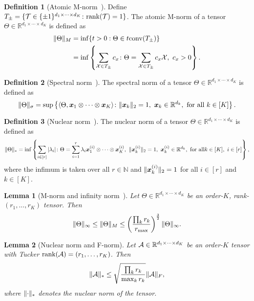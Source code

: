 \documentclass[11pt]{article}
\theoremstyle{plain}
\newtheorem{lem}{Lemma}
\theoremstyle{definition}
\newtheorem{defn}{Definition}
\begin{document}
\begin{defn}[Atomic M-norm~\citep{ghadermarzy2019near}]
Define $T_{\pm}=\{\mathcal{T}\in\{\pm 1 \}^{d_1\times \cdots \times d_K}\colon \text{rank}(\mathcal{T})=1\}$. The atomic M-norm of a tensor $\Theta\in\mathbb{R}^{d_1\times \cdots \times d_K}$ is defined as
\begin{align}
\lVert\Theta\rVert_M&=\inf\{t>0: \Theta\in t\text{conv}(T_{\pm})\}\\
&=\inf\left\{\sum_{\mathcal{X}\in T_{\pm}}c_x\colon \Theta=\sum_{\mathcal{X}\in T_{\pm}} c_x\mathcal{X}, \ c_x>0\right\}.
\end{align}
\end{defn}

\begin{defn}[Spectral norm~\citep{lim2005singular}]
The spectral norm of a tensor $\Theta\in\mathbb{R}^{d_1\times \cdots \times d_K}$ is defined as
\[
\snormSize{}{\Theta}=\sup\left\{\langle \Theta, \mx_1\otimes \cdots \otimes \mx_K\rangle \colon \vnormSize{}{\mx_k}=1,\ \mx_k\in\mathbb{R}^{d_k},\ \text{for all}\ k\in[K]\right\}.
\]
\end{defn}

\begin{defn}[Nuclear norm~\citep{friedland2018nuclear}]
The nuclear norm of a tensor $\Theta\in\mathbb{R}^{d_1\times \cdots \times d_K}$ is defined as
\[
\nnormSize{}{\Theta}=\inf
\left\{
\sum_{i\in[r]}|\lambda_i|\colon \Theta=\sum_{i=1}^r \lambda_i\mx^{(i)}_1\otimes \cdots \otimes \mx^{(i)}_K,\ \vnormSize{}{\mx^{(i)}_k}=1,\ \mx^{(i)}_k\in\mathbb{R}^{d_k},\ \text{for all} k\in[K],\ i\in[r]
\right\},
\]
where the infimum is taken over all $r\in\mathbb{N}$ and $\lVert\bm x^{(i)}_k\rVert_2=1$ for all $i\in[r]$ and $k\in[K]$.
\end{defn}



\begin{lem}[M-norm and infinity norm~\citep{ghadermarzy2019near}]\label{lem:Mnormbound}
Let $\Theta\in\mathbb{R}^{d_1\times \cdots \times d_K}$ be an order-$K$, rank-$(r_1,\ldots,r_K)$ tensor. Then
\[
\lVert\Theta\rVert_\infty\leq \lVert\Theta\rVert_M\leq \left(\prod_k r_k \over r_{\max}\right)^{3\over 2} \lVert\Theta\rVert_\infty.
\]
\end{lem}


\begin{lem}[Nuclear norm and F-norm] \label{lem:nuclear}
Let $\mathcal{A}\in\mathbb{R}^{d_1\times\cdots\times d_K}$ be an order-$K$ tensor with Tucker $\text{rank}(\mathcal{A})=(r_1,\ldots,r_K)$. Then
\[
\lVert\mathcal{A}\rVert_* \leq \sqrt{\prod_k r_k\over \max_k r_k} \lVert\mathcal{A}\rVert_F,
\]
where $\lVert\cdot\rVert_*$ denotes the nuclear norm of the tensor.
\end{lem}
\end{document}

